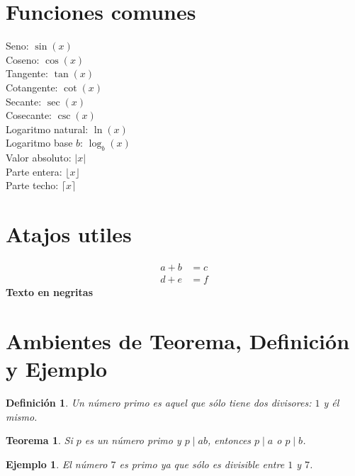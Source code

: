\documentclass{article} %
\begin{document}
\section{Funciones comunes}

Seno: $\sin(x)$ \\
Coseno: $\cos(x)$ \\
Tangente: $\tan(x)$ \\
Cotangente: $\cot(x)$ \\
Secante: $\sec(x)$ \\
Cosecante: $\csc(x)$ \\
Logaritmo natural: $\ln(x)$ \\
Logaritmo base $b$: $\log_b(x)$ \\
Valor absoluto: $|x|$ \\
Parte entera: $\lfloor x \rfloor$ \\
Parte techo: $\lceil x \rceil$

\section{Atajos utiles}
\begin{align*}
a + b &= c \\
d + e &= f
\end{align*}
\textbf{Texto en negritas}

\section{Ambientes de Teorema, Definición y Ejemplo}

\newtheorem{teorema}{Teorema}
\newtheorem{definicion}{Definición}
\newtheorem{ejemplo}{Ejemplo}

\begin{definicion}
Un número primo es aquel que sólo tiene dos divisores: $1$ y él mismo.
\end{definicion}

\begin{teorema}
Si $p$ es un número primo y $p \mid ab$, entonces $p \mid a$ o $p \mid b$.
\end{teorema}

\begin{ejemplo}
El número $7$ es primo ya que sólo es divisible entre $1$ y $7$.
\end{ejemplo}
\end{document}
